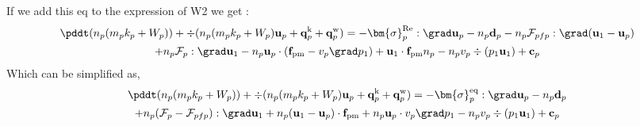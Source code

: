 If we add this eq to the expression of W2 we get :
\begin{multline}
    \pddt(n_p (m_p k_p + W_p))
    + \div(n_p(m_p k_p + W_p) \textbf{u}_p 
    + \textbf{q}_p^\text{k}
    +  \textbf{q}_p^\text{w}
    )
    = 
    - \bm{\sigma}_p^\text{Re} :\grad \textbf{u}_p
    - n_p \textbf{d}_p
    - n_p \mathcal{F}_{pfp} : \grad (\textbf{u}_1 - \textbf{u}_p)\\
    + n_p \mathcal{F}_p : \grad \textbf{u}_1
    - n_p \textbf{u}_p \cdot (\textbf{f}_\text{pm} - v_p\grad p_1)
    + \textbf{u}_1  \cdot \textbf{f}_\text{pm}n_p 
    - n_pv_p \div (p_1 \textbf{u}_1)
    + \textbf{c}_p
\end{multline}
Which can be simplified as, 
\begin{multline}
    \pddt(n_p (m_p k_p + W_p))
    + \div(n_p(m_p k_p + W_p) \textbf{u}_p 
    + \textbf{q}_p^\text{k}
    +  \textbf{q}_p^\text{w}
    )
    = 
    - \bm{\sigma}_p^\text{eq} :\grad \textbf{u}_p
    - n_p \textbf{d}_p\\
    + n_p (\mathcal{F}_p - \mathcal{F}_{pfp}) : \grad \textbf{u}_1
    + n_p (\textbf{u}_1 - \textbf{u}_p)\cdot\textbf{f}_\text{pm}
    + n_p \textbf{u}_p \cdot v_p\grad p_1
    - n_pv_p \div (p_1 \textbf{u}_1)
    + \textbf{c}_p
\end{multline}


